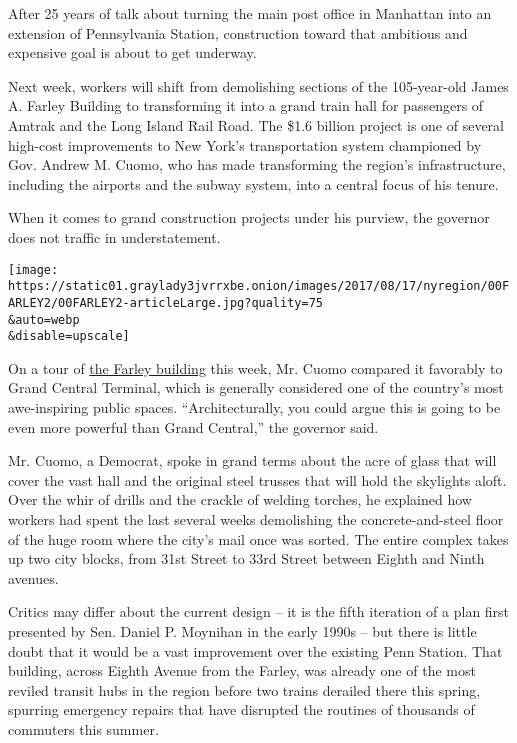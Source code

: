 After 25 years of talk about turning the main post office in Manhattan
into an extension of Pennsylvania Station, construction toward that
ambitious and expensive goal is about to get underway.

Next week, workers will shift from demolishing sections of the
105-year-old James A. Farley Building to transforming it into a grand
train hall for passengers of Amtrak and the Long Island Rail Road. The
\$1.6 billion project is one of several high-cost improvements to New
York's transportation system championed by Gov. Andrew M. Cuomo, who has
made transforming the region's infrastructure, including the airports
and the subway system, into a central focus of his tenure.

When it comes to grand construction projects under his purview, the
governor does not traffic in understatement.

\texttt{[image: https://static01.graylady3jvrrxbe.onion/images/2017/08/17/nyregion/00FARLEY2/00FARLEY2-articleLarge.jpg?quality=75\\\&auto=webp\\\&disable=upscale]}

On a tour of
\href{https://www.nytimes3xbfgragh.onion/2016/01/07/nyregion/cuomo-lays-out-renovation-plan-for-penn-station-and-farley-post-office.html}{the
Farley building} this week, Mr. Cuomo compared it favorably to Grand
Central Terminal, which is generally considered one of the country's
most awe-inspiring public spaces. ``Architecturally, you could argue
this is going to be even more powerful than Grand Central,'' the
governor said.

Mr. Cuomo, a Democrat, spoke in grand terms about the acre of glass that
will cover the vast hall and the original steel trusses that will hold
the skylights aloft. Over the whir of drills and the crackle of welding
torches, he explained how workers had spent the last several weeks
demolishing the concrete-and-steel floor of the huge room where the
city's mail once was sorted. The entire complex takes up two city
blocks, from 31st Street to 33rd Street between Eighth and Ninth
avenues.

Critics may differ about the current design -- it is the fifth iteration
of a plan first presented by Sen. Daniel P. Moynihan in the early 1990s
-- but there is little doubt that it would be a vast improvement over
the existing Penn Station. That building, across Eighth Avenue from the
Farley, was already one of the most reviled transit hubs in the region
before two trains derailed there this spring, spurring emergency repairs
that have disrupted the routines of thousands of commuters this summer.

